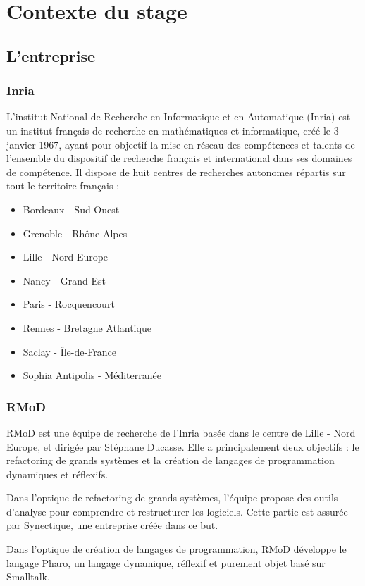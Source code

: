 	\section{Contexte du stage}
	\subsection{L'entreprise}
	\subsubsection{Inria}
	L'institut National de Recherche en Informatique et en Automatique (Inria) est un institut français de recherche en mathématiques et informatique, créé le 3 janvier 1967, ayant pour objectif la mise en réseau des compétences et talents de l'ensemble du dispositif de recherche français et international dans ses domaines de compétence. Il dispose de huit centres de recherches autonomes répartis sur tout le territoire français :
	
	\begin{itemize}
		\item Bordeaux - Sud-Ouest
		\item Grenoble - Rhône-Alpes
		\item Lille - Nord Europe
		\item Nancy - Grand Est
		\item Paris - Rocquencourt
		\item Rennes - Bretagne Atlantique
		\item Saclay - Île-de-France
		\item Sophia Antipolis - Méditerranée
	\end{itemize}

	\subsubsection{RMoD}
	RMoD est une équipe de recherche de l'Inria basée dans le centre de Lille - Nord Europe, et dirigée par Stéphane Ducasse. Elle a principalement deux objectifs : le refactoring de grands systèmes et la création de langages de programmation dynamiques et réflexifs.
	
	Dans l'optique de refactoring de grands systèmes, l'équipe propose des outils d'analyse pour comprendre et restructurer les logiciels. Cette partie est assurée par Synectique, une entreprise créée dans ce but.
	
	Dans l'optique de création de langages de programmation, RMoD développe le langage Pharo, un langage dynamique, réflexif et purement objet basé sur Smalltalk.